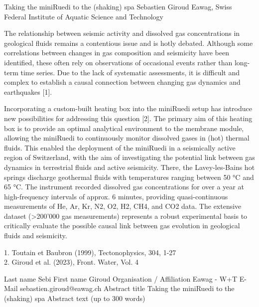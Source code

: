 \begin{conf-abstract}
{Taking the miniRuedi to the (shaking) spa}
{Sebastien Giroud}
{Eawag, Swiss Federal Institute of Aquatic Science and Technology}
{The relationship between seismic activity and dissolved gas concentrations in geological fluids remains a contentious issue and is hotly debated. Although some correlations between changes in gas composition and seismicity have been identified, these often rely on observations of occasional events rather than long-term time series. Due to the lack of systematic assessments, it is difficult and complex to establish a causal connection between changing gas dynamics and earthquakes [1].

Incorporating a custom-built heating box into the miniRuedi setup has introduce new possibilities for addressing this question [2]. The primary aim of this heating box is to provide an optimal analytical environment to the membrane module, allowing the miniRuedi to continuously monitor dissolved gases in (hot) thermal fluids. This enabled the deployment of the miniRuedi in a seismically active region of Switzerland, with the aim of investigating the potential link between gas dynamics in terrestrial fluids and active seismicity. There, the Lavey-les-Bains hot springs discharge geothermal fluids with temperatures ranging between 50 °C and 65 °C. The instrument recorded dissolved gas concentrations for over a year at high-frequency intervals of approx. 6 minutes, providing quasi-continuous measurements of He, Ar, Kr, N2, O2, H2, CH4, and CO2 data. The extensive dataset (>200’000 gas measurements) represents a robust experimental basis to critically evaluate the possible causal link between gas evolution in geological fluids and seismicity.

1. Toutain et Baubron (1999), Tectonophysics, 304, 1-27\\
2. Giroud et al. (2023), Front. Water, Vol. 4}
\end{conf-abstract}


Last name	Sebi
First name	Giroud
Organisation / Affiliation	Eawag - W+T
E-Mail	sebastien.giroud@eawag.ch
Abstract title	Taking the miniRuedi to the (shaking) spa
Abstract text (up to 300 words)	
